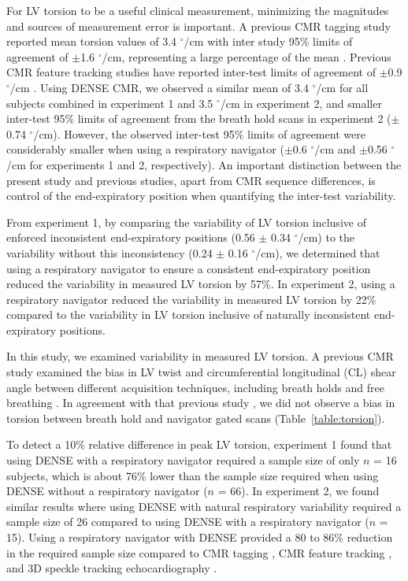 	For LV torsion to be a useful clinical measurement, minimizing the magnitudes and sources of measurement error is important. A previous CMR tagging study reported mean torsion values of 3.4 $^{\circ}$/cm with inter study 95\% limits of agreement of $\pm$1.6 $^{\circ}$/cm, representing a large percentage of the mean \cite{Donekal2013a}. Previous CMR feature tracking studies have reported inter-test limits of agreement of $\pm$0.9 $^{\circ}$/cm \cite{Kowallick2016,Kowallick2014}. Using DENSE CMR, we observed a similar mean of 3.4 $^{\circ}$/cm for all subjects combined in experiment 1 and 3.5 $^{\circ}$/cm in experiment 2, and smaller inter-test 95\% limits of agreement from the breath hold scans in experiment 2 ($\pm$0.74 $^{\circ}$/cm). However, the observed inter-test 95\% limits of agreement were considerably smaller when using a respiratory navigator ($\pm$0.6 $^{\circ}$/cm and $\pm$0.56 $^{\circ}$/cm for experiments 1 and 2, respectively). An important distinction between the present study and previous studies, apart from CMR sequence differences, is control of the end-expiratory position when quantifying the inter-test variability.
	
	From experiment 1, by comparing the variability of LV torsion inclusive of enforced inconsistent end-expiratory positions (0.56 $\pm$ 0.34 $^{\circ}$/cm) to the variability without this inconsistency (0.24 $\pm$ 0.16 $^{\circ}$/cm), we determined that using a respiratory navigator to ensure a consistent end-expiratory position reduced the variability in measured LV torsion by 57\%. In experiment 2, using a respiratory navigator reduced the variability in measured LV torsion by 22\% compared to the variability in LV torsion inclusive of naturally inconsistent end-expiratory positions.
	
	In this study, we examined variability in measured LV torsion. A previous CMR study examined the bias in LV twist and circumferential longitudinal (CL) shear angle between different acquisition techniques, including breath holds and free breathing \cite{Reyhan2017a}. In agreement with that previous study \cite{Reyhan2017a}, we did not observe a bias in torsion between breath hold and navigator gated scans (Table~\ref{table:torsion}).
	
	To detect a 10\% relative difference in peak LV torsion, experiment 1 found that using DENSE with a respiratory navigator required a sample size of only $n$ = 16 subjects, which is about 76\% lower than the sample size required when using DENSE without a respiratory navigator ($n$ = 66). In experiment 2, we found similar results where using DENSE with natural respiratory variability required a sample size of 26 compared to using DENSE with a respiratory navigator ($n$ = 15).  Using a respiratory navigator with DENSE provided a 80 to 86\% reduction in the required sample size compared to CMR tagging \cite{Donekal2013a}, CMR feature tracking \cite{Kowallick2016}, and 3D speckle tracking echocardiography \cite{Kaku2014a}.
	 
